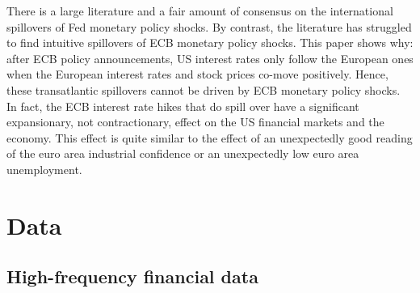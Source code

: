 \documentclass[a4paper,12pt]{article}
\begin{document}
There is a large literature and a fair amount of consensus on the international spillovers of Fed monetary policy shocks.
By contrast, the literature has struggled to find intuitive spillovers of ECB monetary policy shocks.
This paper shows why: after ECB policy announcements, US interest rates only follow the European ones
when the European interest rates and stock prices co-move positively.
Hence, these transatlantic spillovers cannot be driven by ECB monetary policy shocks.
In fact, the ECB interest rate hikes that do spill over have a significant expansionary, not contractionary, effect on the US financial markets and the economy. This effect is quite similar to the effect
of an unexpectedly good reading of the euro area industrial confidence or an unexpectedly low euro area unemployment.



\vspace{2cm}
\clearpage

{}

\appendix

\renewcommand{\thesection}{Appendix \Alph{section}}
\renewcommand{\thesubsection}{\Alph{section}.\arabic{subsection}}
\renewcommand{\theequation}{\Alph{section}.\arabic{equation}}
\renewcommand{\thefigure}{\Alph{section}.\arabic{figure}}
\renewcommand{\thetable}{\Alph{section}.\arabic{table}}


\section{Data}


\subsection{High-frequency financial data}
\end{document}
